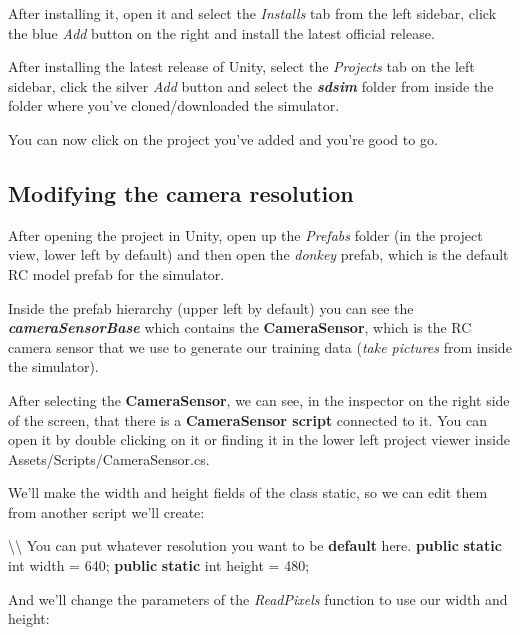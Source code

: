 \documentclass[
]{article}
\newenvironment{Shaded}{}{}
\newcommand{\DataTypeTok}[1]{\textcolor[rgb]{0.56,0.13,0.00}{#1}}
\newcommand{\DecValTok}[1]{\textcolor[rgb]{0.25,0.63,0.44}{#1}}
\newcommand{\KeywordTok}[1]{\textcolor[rgb]{0.00,0.44,0.13}{\textbf{#1}}}
\newcommand{\NormalTok}[1]{#1}
\begin{document}
After installing it, open it and select the \emph{Installs} tab from the
left sidebar, click the blue \emph{Add} button on the right and install
the latest official release.

After installing the latest release of Unity, select the \emph{Projects}
tab on the left sidebar, click the silver \emph{Add} button and select
the \textbf{\emph{sdsim}} folder from inside the folder where you've
cloned/downloaded the simulator.

You can now click on the project you've added and you're good to go.

\hypertarget{header-n22}{%
\subsection{Modifying the camera resolution}\label{header-n22}}

After opening the project in Unity, open up the \emph{Prefabs} folder
(in the project view, lower left by default) and then open the
\emph{donkey} prefab, which is the default RC model prefab for the
simulator.

Inside the prefab hierarchy (upper left by default) you can see the
\textbf{\emph{cameraSensorBase}} which contains the
\textbf{CameraSensor}, which is the RC camera sensor that we use to
generate our training data (\emph{take pictures} from inside the
simulator).

After selecting the \textbf{CameraSensor}, we can see, in the inspector
on the right side of the screen, that there is a \textbf{CameraSensor
script} connected to it. You can open it by double clicking on it or
finding it in the lower left project viewer inside
Assets/Scripts/CameraSensor.cs.

We'll make the width and height fields of the class static, so we can
edit them from another script we'll create:

\begin{Shaded}
\begin{Highlighting}[]
\NormalTok{\textbackslash{}\textbackslash{} You can put whatever resolution you want to be }\KeywordTok{default}\NormalTok{ here.}
\KeywordTok{public} \KeywordTok{static} \DataTypeTok{int}\NormalTok{ width = }\DecValTok{640}\NormalTok{;}
\KeywordTok{public} \KeywordTok{static} \DataTypeTok{int}\NormalTok{ height = }\DecValTok{480}\NormalTok{;}
\end{Highlighting}
\end{Shaded}

And we'll change the parameters of the \emph{ReadPixels} function to use
our width and height:
\end{document}
